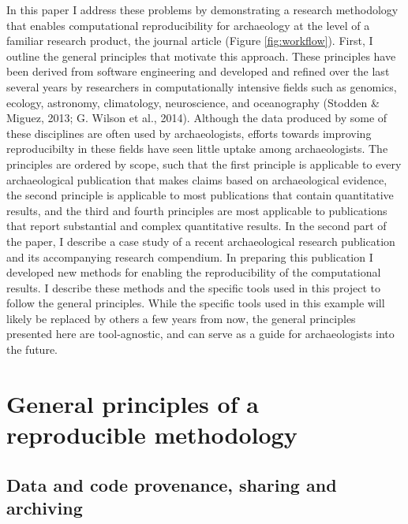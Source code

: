 \documentclass[american,man]{apa6}
\begin{document}
In this paper I address these problems by demonstrating a research
methodology that enables computational reproducibility for archaeology
at the level of a familiar research product, the journal article (Figure
\ref{fig:workflow}). First, I outline the general principles that
motivate this approach. These principles have been derived from software
engineering and developed and refined over the last several years by
researchers in computationally intensive fields such as genomics,
ecology, astronomy, climatology, neuroscience, and oceanography (Stodden
\& Miguez, 2013; G. Wilson et al., 2014). Although the data produced by
some of these disciplines are often used by archaeologists, efforts
towards improving reproducibilty in these fields have seen little uptake
among archaeologists. The principles are ordered by scope, such that the
first principle is applicable to every archaeological publication that
makes claims based on archaeological evidence, the second principle is
applicable to most publications that contain quantitative results, and
the third and fourth principles are most applicable to publications that
report substantial and complex quantitative results. In the second part
of the paper, I describe a case study of a recent archaeological
research publication and its accompanying research compendium. In
preparing this publication I developed new methods for enabling the
reproducibility of the computational results. I describe these methods
and the specific tools used in this project to follow the general
principles. While the specific tools used in this example will likely be
replaced by others a few years from now, the general principles
presented here are tool-agnostic, and can serve as a guide for
archaeologists into the future.

\section{General principles of a reproducible
methodology}\label{general-principles-of-a-reproducible-methodology}

\subsection{Data and code provenance, sharing and
archiving}\label{data-and-code-provenance-sharing-and-archiving}
\end{document}
